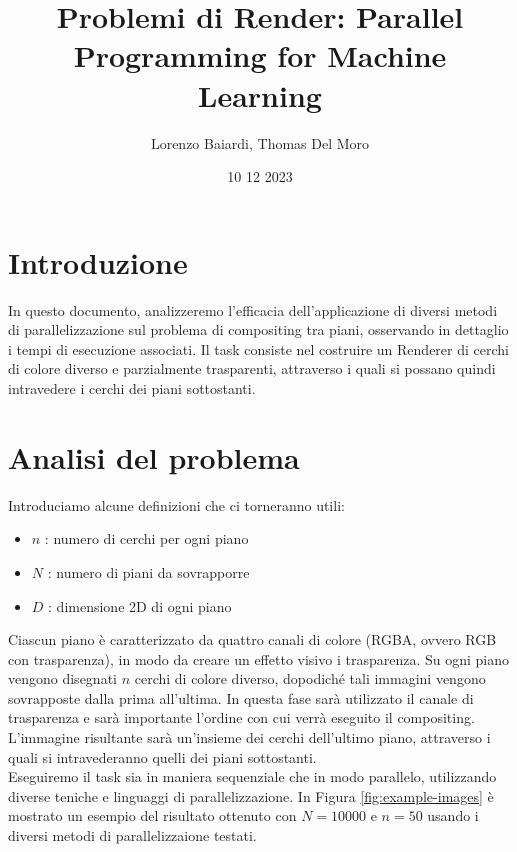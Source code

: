 \documentclass[11pt]{article}
\title{Problemi di Render: Parallel Programming for Machine Learning}
\author{Lorenzo Baiardi, Thomas Del Moro}
\date{10 12 2023}
\begin{document}
    \maketitle

    \section{Introduzione}\label{sec:introduzione}
    In questo documento, analizzeremo l'efficacia dell'applicazione di diversi metodi di parallelizzazione
    sul problema di compositing tra piani, osservando in dettaglio i tempi di esecuzione associati.
    Il task consiste nel costruire un Renderer di cerchi di colore diverso e parzialmente trasparenti, attraverso i quali si possano quindi intravedere i cerchi dei piani sottostanti.

    \section{Analisi del problema}\label{sec:analisi-del-problema}
    Introduciamo alcune definizioni che ci torneranno utili:
    \begin{itemize}
        \item $n$ : numero di cerchi per ogni piano
        \item $N$ : numero di piani da sovrapporre
        \item $D$ : dimensione 2D di ogni piano
    \end{itemize}
    Ciascun piano è caratterizzato da quattro canali di colore (RGBA, ovvero RGB con trasparenza), in modo da creare un effetto visivo i trasparenza.
    Su ogni piano vengono disegnati $n$ cerchi di colore diverso, dopodiché tali immagini vengono sovrapposte dalla prima all'ultima.
    In questa fase sarà utilizzato il canale di trasparenza e sarà importante l'ordine con cui verrà eseguito il compositing.
    L'immagine risultante sarà un'insieme dei cerchi dell'ultimo piano, attraverso i quali si intravederanno quelli dei piani sottostanti.\\

    Eseguiremo il task sia in maniera sequenziale che in modo parallelo, utilizzando diverse teniche e linguaggi di parallelizzazione.
    In Figura \ref{fig:example-images} è mostrato un esempio del risultato ottenuto con $N=10000$ e $n=50$ usando i diversi metodi di parallelizzaione testati.
\end{document}
